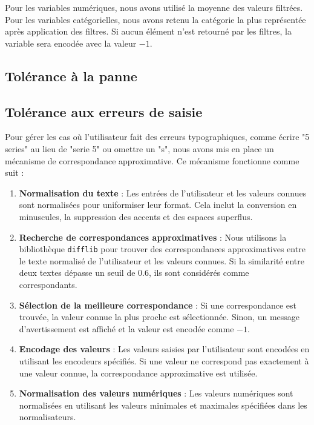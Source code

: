 \documentclass[12pt]{report}
\begin{document}
Pour les variables numériques, nous avons utilisé la moyenne des valeurs filtrées. Pour les variables catégorielles, nous avons retenu la catégorie la plus représentée après application des filtres. Si aucun élément n'est retourné par les filtres, la variable sera encodée avec la valeur \(-1\).


\subsection{Tolérance à la panne}

\subsection{Tolérance aux erreurs de saisie}

Pour gérer les cas où l'utilisateur fait des erreurs typographiques, comme écrire "5 series" au lieu de "serie 5" ou omettre un "s", nous avons mis en place un mécanisme de correspondance approximative. Ce mécanisme fonctionne comme suit :

\begin{enumerate}
    \item \textbf{Normalisation du texte} : Les entrées de l'utilisateur et les valeurs connues sont normalisées pour uniformiser leur format. Cela inclut la conversion en minuscules, la suppression des accents et des espaces superflus.
    \item \textbf{Recherche de correspondances approximatives} : Nous utilisons la bibliothèque \texttt{difflib} pour trouver des correspondances approximatives entre le texte normalisé de l'utilisateur et les valeurs connues. Si la similarité entre deux textes dépasse un seuil de 0.6, ils sont considérés comme correspondants.
    \item \textbf{Sélection de la meilleure correspondance} : Si une correspondance est trouvée, la valeur connue la plus proche est sélectionnée. Sinon, un message d'avertissement est affiché et la valeur est encodée comme \(-1\).
    \item \textbf{Encodage des valeurs} : Les valeurs saisies par l'utilisateur sont encodées en utilisant les encodeurs spécifiés. Si une valeur ne correspond pas exactement à une valeur connue, la correspondance approximative est utilisée.
    \item \textbf{Normalisation des valeurs numériques} : Les valeurs numériques sont normalisées en utilisant les valeurs minimales et maximales spécifiées dans les normalisateurs.
\end{enumerate}
\end{document}
